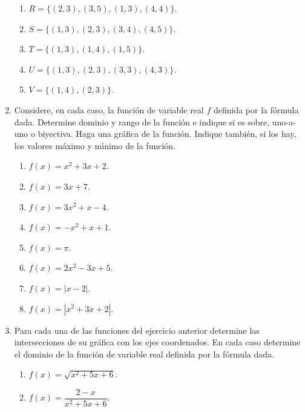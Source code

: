 \begin{enumerate}
\begin{enumerate}
\item $R=\{(2,3),(3,5),(1,3),(4,4)\}$.

\item $S=\{(1,3),(2,3),(3,4),(4,5)\}$.

\item $T=\{(1,3),(1,4),(1,5)\}$.

\item $U=\{(1,3),(2,3),(3,3),(4,3)\}$.

\item $V=\{(1,4),(2,3)\}$.
\end{enumerate}

\item Considere, en cada caso, la funci\'{o}n de variable real $f$ definida
por la f\'{o}rmula dada. Determine dominio y rango de la funci\'{o}n e indique
si es sobre, uno-a-uno o biyectiva. Haga una gr\'{a}fica de la funci\'{o}n.
Indique tambi\'{e}n, si los hay, los valores m\'{a}ximo y m\'{\i}nimo de la funci\'{o}n.

\begin{enumerate}
\item $f(x)=x^{2}+3x+2$.

\item $f(x)=3x+7$.

\item $f(x)=3x^{2}+x-4$.

\item $f(x)=-x^{2}+x+1$.

\item $f(x)=\pi$.

\item $f(x)=2x^{2}-3x+5$.

\item $f(x)=|x-2|$.

\item $f(x)=|x^{2}+3x+2|$.
\end{enumerate}

\item Para cada una de las funciones del ejercicio anterior determine las
intersecciones de su gr\'{a}fica con los ejes coordenados. En cada caso
determine el dominio de la funci\'{o}n de variable real definida por la
f\'{o}rmula dada.

\begin{enumerate}
\item $f(x)=\sqrt{x^{2}+5x+6}$.

\item $f(x)=\dfrac{2-x}{x^{2}+5x+6}$.


\end{enumerate}
\end{enumerate}
